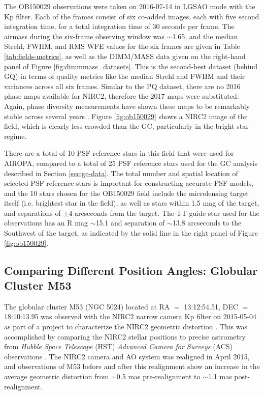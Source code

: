 \documentclass[]{spie}  %
\begin{document}
The OB150029 observations were taken on 2016-07-14 in LGSAO mode with the Kp filter. Each of the frames consist of six co-added images, each with five second integration time, for a total integration time of 30 seconds per frame. The airmass during the six-frame observing window was $\sim$1.65, and the median Strehl, FWHM, and RMS WFE values for the six frames are given in Table \ref{tab:fields-metrics}, as well as the DIMM/MASS data given on the right-hand panel of Figure \ref{fig:dimmmass_datasets}. This is the second-best dataset (behind GQ) in terms of quality metrics like the median Strehl and FWHM and their variances across all six frames. Similar to the PQ dataset, there are no 2016 phase maps available for NIRC2, therefore the 2017 maps were substituted. Again, phase diversity measurements have shown these maps to be remarkably stable across several years \cite{Ciurlo:inprep}. Figure \ref{fig:ob150029} shows a NIRC2 image of the field, which is clearly less crowded than the GC, particularly in the bright star regime. 

\indent There are a total of 10 PSF reference stars in this field that were used for AIROPA, compared to a total of 25 PSF reference stars used for the GC analysis described in Section \ref{sec:gc-data}. The total number and spatial location of selected PSF reference stars is important for constructing accurate PSF models, and the 10 stars chosen for the OB150029 field include the microlensing target itself (i.e. brightest star in the field), as well as stars within 1.5 mag of the target, and separations of $\pm4$ arcseconds from the target. The TT guide star used for the observations has an R mag ${\sim}$15.1 and separation of ${\sim}$13.8 arcseconds to the Southwest of the target, as indicated by the solid line in the right panel of Figure \ref{fig:ob150029}.


\subsection{Comparing Different Position Angles: Globular Cluster M53} \label{sec:m53-data}
The globular cluster M53 (NGC 5024) located at RA $=$ 13:12:54.51, DEC $=$ 18:10:13.95 was observed with the NIRC2 narrow camera Kp filter on 2015-05-04 as part of a project to characterize the NIRC2 geometric distortion \cite{service:2016a}. This was accomplished by comparing the NIRC2 stellar positions to precise astrometry from \textit{Hubble Space Telescope} (HST) \textit{Advanced Camera for Surveys} (ACS) observations \cite{anderson:2008a}. The NIRC2 camera and AO system was realigned in April 2015, and observations of M53 before and after this realignment show an increase in the average geometric distortion from $\sim$0.5 mas pre-realignment to $\sim$1.1 mas post-realignment.
\end{document}
